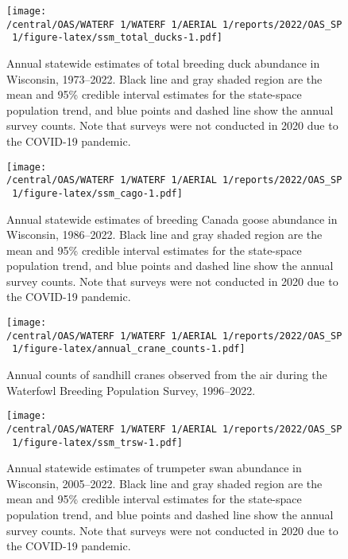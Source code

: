 \documentclass[
  12pt,
]{article}
\begin{document}
\newpage

\begin{figure}
\centering
\texttt{[image: /central/OAS/WATERF~1/WATERF~1/AERIAL~1/reports/2022/OAS\_SP~1/figure-latex/ssm\_total\_ducks-1.pdf]}
\caption{\label{fig:ssm_total_ducks}Annual statewide estimates of total
breeding duck abundance in Wisconsin, 1973--2022. Black line and gray
shaded region are the mean and 95\% credible interval estimates for the
state-space population trend, and blue points and dashed line show the
annual survey counts. Note that surveys were not conducted in 2020 due
to the COVID-19 pandemic.}
\end{figure}

\newpage

\begin{figure}
\centering
\texttt{[image: /central/OAS/WATERF~1/WATERF~1/AERIAL~1/reports/2022/OAS\_SP~1/figure-latex/ssm\_cago-1.pdf]}
\caption{\label{fig:ssm_cago}Annual statewide estimates of breeding
Canada goose abundance in Wisconsin, 1986--2022. Black line and gray
shaded region are the mean and 95\% credible interval estimates for the
state-space population trend, and blue points and dashed line show the
annual survey counts. Note that surveys were not conducted in 2020 due
to the COVID-19 pandemic.}
\end{figure}

\newpage

\begin{figure}
\centering
\texttt{[image: /central/OAS/WATERF~1/WATERF~1/AERIAL~1/reports/2022/OAS\_SP~1/figure-latex/annual\_crane\_counts-1.pdf]}
\caption{\label{fig:annual_crane_counts}Annual counts of sandhill cranes
observed from the air during the Waterfowl Breeding Population Survey,
1996--2022.}
\end{figure}

\newpage

\begin{figure}
\centering
\texttt{[image: /central/OAS/WATERF~1/WATERF~1/AERIAL~1/reports/2022/OAS\_SP~1/figure-latex/ssm\_trsw-1.pdf]}
\caption{\label{fig:ssm_trsw}Annual statewide estimates of trumpeter
swan abundance in Wisconsin, 2005--2022. Black line and gray shaded
region are the mean and 95\% credible interval estimates for the
state-space population trend, and blue points and dashed line show the
annual survey counts. Note that surveys were not conducted in 2020 due
to the COVID-19 pandemic.}
\end{figure}
\end{document}
